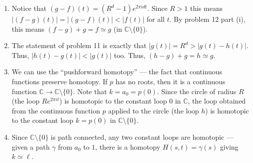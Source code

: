 \documentclass[12 pt, letterpaper]{hmcpset}
\begin{document}
\begin{solution}
	\begin{enumerate}
		\item Notice that $(g - f)(t) = (R^{d} - 1) e^{2 \pi i d t}$. Since $R > 1$ this means $\lvert (f - g)(t) \rvert = \lvert (g - f)(t) \rvert < \lvert f(t) \rvert$ for all $t$. By problem 12 part (i), this means $(f - g) + g = f \simeq g$ (in $\mathbb{C} \setminus \{ 0 \}$).
		\item The statement of problem 11 is exactly that $\lvert g(t) \rvert = R^{d} > \lvert g(t) - h(t) \rvert$. Thus, $\lvert h(t) - g(t) \rvert < \lvert g(t) \rvert$ too. Thus, $(h - g) + g = h \simeq g$.
		\item We can use the ``pushforward homotopy'' --- the fact that continuous functions preserve homotopy. If $p$ has no roots, then it is a continuous function $\mathbb{C} \to \mathbb{C} \setminus \{ 0 \}$. Note that $k = a_{0} = p(0)$. Since the circle of radius $R$ (the loop $R e^{2 \pi i t}$) is homotopic to the constant loop $0$ in $\mathbb{C}$, the loop obtained from the continuous function $p$ applied to the circle (the loop $h$) is homotopic to the constant loop $k = p(0)$ in $\mathbb{C} \setminus \{ 0 \}$.
		\item Since $\mathbb{C} \setminus \{ 0 \}$ is path connected, any two constant loops are homotopic --- given a path $\gamma$ from $a_{0}$ to $1$, there is a homotopy $H(s, t) = \gamma(s)$ giving $k \simeq \ell$.
	\end{enumerate}
\end{solution}

\pagebreak
\end{document}
